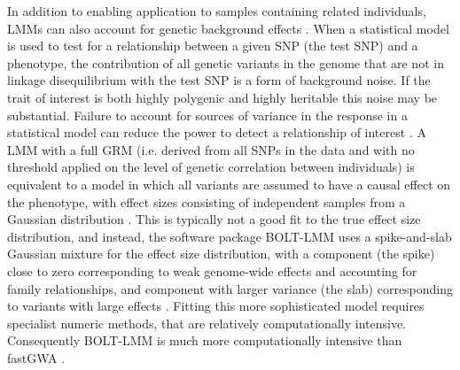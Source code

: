 \documentclass[fleqn,10pt]{wlscirep}
\begin{document}
In addition to enabling application to samples containing related individuals, LMMs can also account for genetic background effects \cite{listgarten2012improved,yang2014advantages}. When a statistical model is used to test for a relationship between a given SNP (the test SNP) and a phenotype, the contribution of all genetic variants in the genome that are not in linkage disequilibrium with the test SNP is a form of background noise. If the trait of interest is both highly polygenic and highly heritable this noise may be substantial. Failure to account for sources of variance in the response in a statistical model can reduce the power to detect a relationship of interest \cite{fisher1935, neuhaus1998estimation}. A LMM with a full GRM (i.e. derived from all SNPs in the data and with no threshold applied on the level of genetic correlation between individuals) is equivalent to a model in which all variants are assumed to have a causal effect on the phenotype, with effect sizes consisting of independent samples from a Gaussian distribution \cite{BOLT}. This is typically not a good fit to the true effect size distribution, and instead, the software package BOLT-LMM \cite{BOLT} uses a spike-and-slab Gaussian mixture for the effect size distribution, with a component (the spike) close to zero corresponding to weak genome-wide effects and accounting for family relationships, and component with larger variance (the slab) corresponding to variants with large effects \cite{BOLT}. Fitting this more sophisticated model requires specialist numeric methods, that are relatively computationally intensive. Consequently BOLT-LMM is much more computationally intensive than fastGWA \cite{jiang2019resource}. 
\end{document}
